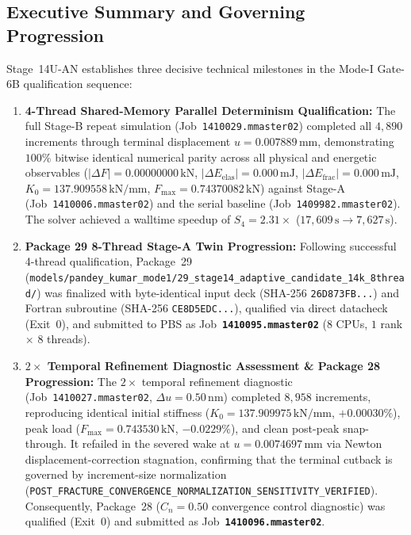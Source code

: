 \subsection{Executive Summary and Governing Progression}
\label{subsec:stage14uan_executive_summary}

Stage~14U-AN establishes three decisive technical milestones in the Mode-I Gate-6B qualification sequence:
\begin{enumerate}
  \item \textbf{4-Thread Shared-Memory Parallel Determinism Qualification:} The full Stage-B repeat simulation (Job~\texttt{1410029.mmaster02}) completed all $4{,}890$ increments through terminal displacement $u = 0.007889\,\mathrm{mm}$, demonstrating $100\%$ bitwise identical numerical parity across all physical and energetic observables ($|\Delta F| = 0.00000000\,\mathrm{kN}$, $|\Delta E_{\mathrm{elas}}| = 0.000\,\mathrm{mJ}$, $|\Delta E_{\mathrm{frac}}| = 0.000\,\mathrm{mJ}$, $K_0 = 137.909558\,\mathrm{kN/mm}$, $F_{\max} = 0.74370082\,\mathrm{kN}$) against Stage-A (Job~\texttt{1410006.mmaster02}) and the serial baseline (Job~\texttt{1409982.mmaster02}). The solver achieved a walltime speedup of $S_4 = 2.31\times$ ($17{,}609\,\mathrm{s} \to 7{,}627\,\mathrm{s}$).
  \item \textbf{Package 29 8-Thread Stage-A Twin Progression:} Following successful 4-thread qualification, Package~29 (\texttt{models/pandey\_kumar\_mode1/29\_stage14\_adaptive\_candidate\_14k\_8thread/}) was finalized with byte-identical input deck (SHA-256 \texttt{26D873FB...}) and Fortran subroutine (SHA-256 \texttt{CE8D5EDC...}), qualified via direct datacheck (Exit~0), and submitted to PBS as Job~\textbf{\texttt{1410095.mmaster02}} ($8$ CPUs, $1$ rank $\times$ $8$ threads).
  \item \textbf{$2\times$ Temporal Refinement Diagnostic Assessment \& Package 28 Progression:} The $2\times$ temporal refinement diagnostic (Job~\texttt{1410027.mmaster02}, $\Delta u = 0.50\,\mathrm{nm}$) completed $8{,}958$ increments, reproducing identical initial stiffness ($K_0 = 137.909975\,\mathrm{kN/mm}$, $+0.00030\%$), peak load ($F_{\max} = 0.743530\,\mathrm{kN}$, $-0.0229\%$), and clean post-peak snap-through. It refailed in the severed wake at $u = 0.0074697\,\mathrm{mm}$ via Newton displacement-correction stagnation, confirming that the terminal cutback is governed by increment-size normalization (\texttt{POST\_FRACTURE\_CONVERGENCE\_NORMALIZATION\_SENSITIVITY\_VERIFIED}). Consequently, Package~28 ($C_n = 0.50$ convergence control diagnostic) was qualified (Exit~0) and submitted as Job~\textbf{\texttt{1410096.mmaster02}}.
\end{enumerate}

